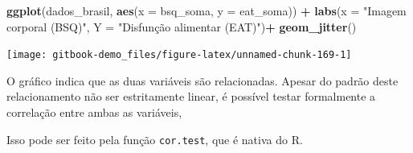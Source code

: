 \documentclass[
]{book}
\newenvironment{Shaded}{\begin{snugshade}}{\end{snugshade}}
\newcommand{\DataTypeTok}[1]{\textcolor[rgb]{0.13,0.29,0.53}{#1}}
\newcommand{\KeywordTok}[1]{\textcolor[rgb]{0.13,0.29,0.53}{\textbf{#1}}}
\newcommand{\NormalTok}[1]{#1}
\newcommand{\OperatorTok}[1]{\textcolor[rgb]{0.81,0.36,0.00}{\textbf{#1}}}
\newcommand{\StringTok}[1]{\textcolor[rgb]{0.31,0.60,0.02}{#1}}
\begin{document}
\begin{Shaded}
\begin{Highlighting}[]
\KeywordTok{ggplot}\NormalTok{(dados_brasil, }\KeywordTok{aes}\NormalTok{(}\DataTypeTok{x =}\NormalTok{ bsq_soma, }\DataTypeTok{y =}\NormalTok{ eat_soma)) }\OperatorTok{+}
\StringTok{  }\KeywordTok{labs}\NormalTok{(}\DataTypeTok{x =} \StringTok{"Imagem corporal (BSQ)"}\NormalTok{, }\DataTypeTok{Y =} \StringTok{"Disfunção alimentar (EAT)"}\NormalTok{)}\OperatorTok{+}
\StringTok{  }\KeywordTok{geom_jitter}\NormalTok{()}
\end{Highlighting}
\end{Shaded}

\begin{center}\texttt{[image: gitbook-demo\_files/figure-latex/unnamed-chunk-169-1]} \end{center}

O gráfico indica que as duas variáveis são relacionadas. Apesar do padrão deste relacionamento não ser estritamente linear, é possível testar formalmente a correlação entre ambas as variáveis,

Isso pode ser feito pela função \texttt{cor.test}, que é nativa do R.

\begin{Shaded}
\end{Shaded}
\end{document}
